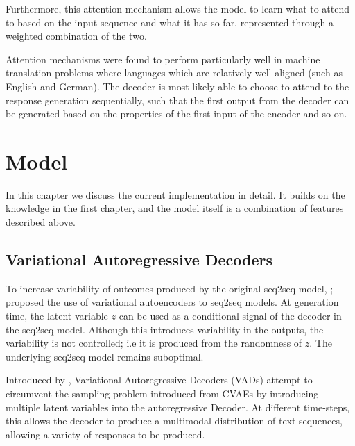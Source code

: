 \documentclass[12pt,twoside]{report}
\begin{document}
Furthermore, this attention mechanism allows the model to learn what to attend to based on the input sequence and what it has so far, represented through a weighted combination of the two.

Attention mechanisms were found to perform particularly well in machine translation problems where languages which are relatively well aligned (such as English and German). The decoder is most likely able to choose to attend to the response generation sequentially, such that the first output from the decoder can be generated based on the properties of the first input of the encoder and so on.





\chapter{Model}

In this chapter we discuss the current implementation in detail. It builds on the knowledge in the first chapter, and the model itself is a combination of features described above.

\section{Variational Autoregressive Decoders}

To increase variability of outcomes produced by the original seq2seq model, \cite{serban_hierarchical_2016}; \cite{zhao_learning_2017} proposed the use of variational autoencoders to seq2seq models. At generation time, the latent variable $z$ can be used as a conditional signal of the decoder in the seq2seq model. Although this introduces variability in the outputs, the variability is not controlled; i.e it is produced from the randomness of $z$. The underlying seq2seq model remains suboptimal.

Introduced by \cite{du_variational_2018}, Variational Autoregressive Decoders (VADs) attempt to circumvent the sampling problem introduced from CVAEs by introducing multiple latent variables into the autoregressive Decoder. At different time-steps, this allows the decoder to produce a multimodal distribution of text sequences, allowing a variety of responses to be produced. 
\end{document}
